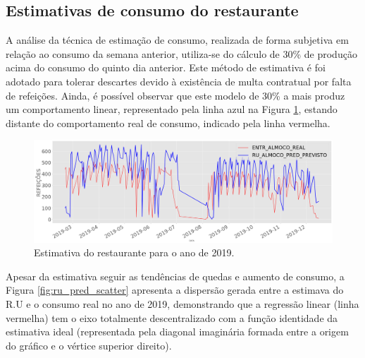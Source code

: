     \subsection{Estimativas de consumo do restaurante}
    
        A análise da técnica de estimação de consumo, realizada de forma subjetiva em relação ao consumo da semana anterior, utiliza-se do cálculo de 30\% de produção acima do consumo do quinto dia anterior. Este método de estimativa é foi adotado para tolerar descartes devido à existência de multa contratual por falta de refeições. Ainda, é possível observar que este modelo de 30\% a mais produz um comportamento linear, representado pela linha azul na Figura  \ref{fig:ru_pred},  estando distante do comportamento real de consumo, indicado pela linha vermelha. 

        \begin{figure}[!htbp]                \includegraphics[width=\textwidth]{./Figuras/resultados/case1_ru_pred.png}
                \caption{Estimativa do restaurante para o ano de 2019.} \label{fig:ru_pred} 
        \end{figure}

            
        
        Apesar da estimativa seguir as tendências de quedas e aumento de consumo, a Figura \ref{fig:ru_pred_scatter} apresenta a dispersão gerada entre a estimava do R.U e o consumo real no ano de 2019, demonstrando que a regressão linear (linha vermelha) tem o eixo totalmente descentralizado com a função identidade da estimativa ideal (representada pela diagonal imaginária formada entre a origem do gráfico e o vértice superior direito). 
        

                \begin{figure}[ht]
                \end{figure} 

